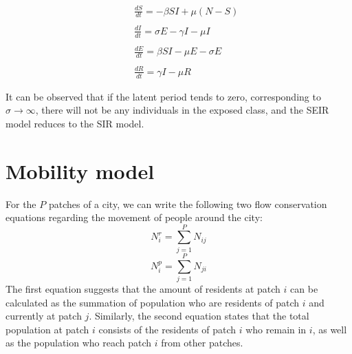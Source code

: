 \documentclass[review]{elsarticle}
\theoremstyle{plain}
\theoremstyle{definition}
\theoremstyle{remark}
\numberwithin{equation}{section}
\theoremstyle{remark}
\begin{document}
\begin{eqnarray}
&&\frac{dS}{dt}=-\beta SI+\mu (N-S) \\ \nonumber
\\ 
&&\frac{dI}{dt}=\sigma E-\gamma I-\mu I\\ \nonumber
\\
&&\frac{dE}{dt}=\beta SI-\mu E-\sigma E\\ \nonumber
\\ 
&&\frac{dR}{dt}=\gamma I-\mu R 
\end{eqnarray}

It can be observed that if the latent period tends to zero, corresponding to $\sigma \rightarrow \infty$, there will not be any individuals in the exposed class, and the SEIR model reduces to the SIR model.

\section{Mobility model}
For the $P$ patches of a city, we can write the following two flow conservation equations regarding the movement of people around the city:
\begin{equation}
N_i^r=\sum_{j=1}^{P} N_{ij}
\end{equation}
\begin{equation}
N_i^p=\sum_{j=1}^P N_{ji}
\end{equation}
The first equation suggests that the amount of residents at patch $i$ can be calculated as the summation of population who are residents of  patch $i$ and currently at patch $j$. Similarly, the second equation states that the total population at patch $i$ consists of the residents of patch $i$ who remain in $i$, as well as the population who reach patch $i$ from other patches.
\end{document}
